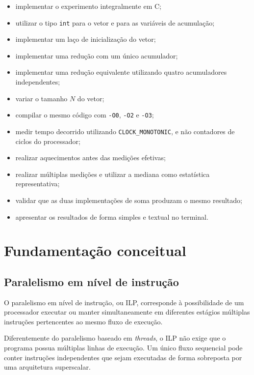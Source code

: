 \begin{itemize}
    \item implementar o experimento integralmente em C;
    \item utilizar o tipo \texttt{int} para o vetor e para as variáveis de acumulação;
    \item implementar um laço de inicialização do vetor;
    \item implementar uma redução com um único acumulador;
    \item implementar uma redução equivalente utilizando quatro acumuladores independentes;
    \item variar o tamanho \(N\) do vetor;
    \item compilar o mesmo código com \texttt{-O0}, \texttt{-O2} e \texttt{-O3};
    \item medir tempo decorrido utilizando \texttt{CLOCK\_MONOTONIC}, e não contadores de
    ciclos do processador;
    \item realizar aquecimentos antes das medições efetivas;
    \item realizar múltiplas medições e utilizar a mediana como estatística representativa;
    \item validar que as duas implementações de soma produzam o mesmo resultado;
    \item apresentar os resultados de forma simples e textual no terminal.
\end{itemize}


\section{Fundamentação conceitual}

\label{sec:atvd02-fundamentacao}

\subsection{Paralelismo em nível de instrução}

O paralelismo em nível de instrução, ou ILP, corresponde à possibilidade de um processador
executar ou manter simultaneamente em diferentes estágios múltiplas instruções pertencentes
ao mesmo fluxo de execução.

Diferentemente do paralelismo baseado em \textit{threads}, o ILP não exige que o programa
possua múltiplas linhas de execução. Um único fluxo sequencial pode conter instruções
independentes que sejam executadas de forma sobreposta por uma arquitetura superscalar.

